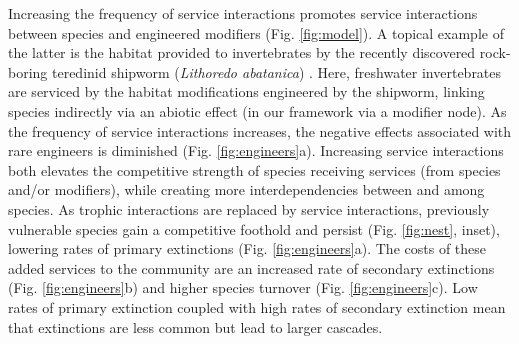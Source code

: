 \documentclass[twocolumn,preprintnumbers,amsmath,amssymb,superscriptaddress,linenumbers]{revtex4-1}
\begin{document}
Increasing the frequency of service interactions promotes service interactions between species and engineered modifiers (Fig. \ref{fig:model}).
A topical example of the latter is the habitat provided to invertebrates by the recently discovered rock-boring teredinid shipworm (\emph{Lithoredo abatanica}) \cite{Shipway2019}.
Here, freshwater invertebrates are serviced by the habitat modifications engineered by the shipworm, linking species indirectly via an abiotic effect (in our framework via a modifier node).
As the frequency of service interactions increases, the negative effects associated with rare engineers is diminished (Fig. \ref{fig:engineers}a).
Increasing service interactions both elevates the competitive strength of species receiving services (from species and/or modifiers), while creating more interdependencies between and among species.
As trophic interactions are replaced by service interactions, previously vulnerable species gain a competitive foothold and persist (Fig. \ref{fig:nest}, inset), lowering rates of primary extinctions (Fig. \ref{fig:engineers}a). %
The costs of these added services to the community are an increased rate of secondary extinctions (Fig. \ref{fig:engineers}b) and higher species turnover (Fig. \ref{fig:engineers}c).
Low rates of primary extinction coupled with high rates of secondary extinction mean that extinctions are less common but lead to larger cascades.



\end{document}
